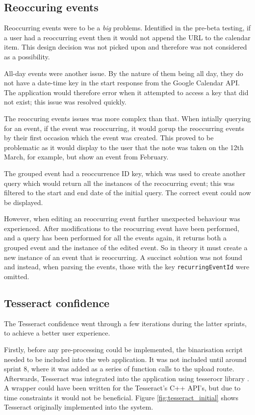 \subsection{Reoccuring events}
Reoccurring events were to be a \textit{big} problems. Identified in the pre-beta testing, if a user had a reoccurring event then it would not append the URL to the calendar item. This design decision was not picked upon and therefore was not considered as a possibility.

All-day events were another issue. By the nature of them being all day, they do not have a date-time key in the start response from the Google Calendar API. The application would therefore error when it attempted to access a key that did not exist; this issue was resolved quickly.

The reoccuring events issues was more complex than that. When intially querying for an event, if the event was reoccurring, it would gorup the reoccurring events by their first occasion which the event was created. This proved to be problematic as it would display to the user that the note was taken on the 12th March, for example, but show an event from February.

The grouped event had a reoccurrence ID key, which was used to create another query which would return all the instances of the recocurring event; this was filtered to the start and end date of the initial query. The correct event could now be displayed.

However, when editing an reoccurring event further unexpected behaviour was experienced. After modifications to the reocurring event have been performed, and a query has been performed for all the events again, it returns both a grouped event and the instance of the edited event. So in theory it must create a new instance of an event that is reoccurring. A succinct solution was not found and instead, when parsing the events, those with the key \texttt{recurringEventId} were omitted.

\subsection{Tesseract confidence}
The Tesseract confidence went through a few iterations during the latter sprints, to achieve a better user experience.

Firstly, before any pre-processing could be implemented, the binarisation script needed to be included into the web application. It was not included until around sprint 8, where it was added as a series of function calls to the upload route. Afterwards, Tesseract was integrated into the application using tesserocr library \cite{citeulike:14021437}. A wrapper could have been written for the Tesseract's C++ API's, but due to time constraints it would not be beneficial. Figure \ref{fig:tesseract_initial} shows Tesseract originally implemented into the system.

